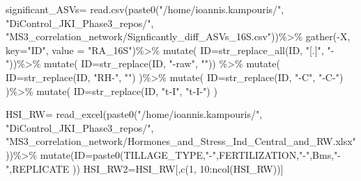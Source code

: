 \documentclass[
]{article}
\newenvironment{Shaded}{\begin{snugshade}}{\end{snugshade}}
\newcommand{\AttributeTok}[1]{\textcolor[rgb]{0.77,0.63,0.00}{#1}}
\newcommand{\DecValTok}[1]{\textcolor[rgb]{0.00,0.00,0.81}{#1}}
\newcommand{\FunctionTok}[1]{\textcolor[rgb]{0.00,0.00,0.00}{#1}}
\newcommand{\NormalTok}[1]{#1}
\newcommand{\OtherTok}[1]{\textcolor[rgb]{0.56,0.35,0.01}{#1}}
\newcommand{\SpecialCharTok}[1]{\textcolor[rgb]{0.00,0.00,0.00}{#1}}
\newcommand{\StringTok}[1]{\textcolor[rgb]{0.31,0.60,0.02}{#1}}
\begin{document}
\begin{Shaded}
\begin{Highlighting}[]
\NormalTok{significant\_ASVs}\OtherTok{=} \FunctionTok{read.csv}\NormalTok{(}\FunctionTok{paste0}\NormalTok{(}\StringTok{"/home/ioannis.kampouris/"}\NormalTok{,}
\StringTok{"DiControl\_JKI\_Phase3\_repos/"}\NormalTok{,}
\StringTok{"MS3\_correlation\_network/Signficantly\_diff\_ASVs\_16S.csv"}\NormalTok{))}\SpecialCharTok{\%\textgreater{}\%}
  \FunctionTok{gather}\NormalTok{(}\SpecialCharTok{{-}}\NormalTok{X, }\AttributeTok{key=}\StringTok{"ID"}\NormalTok{, }\AttributeTok{value =} \StringTok{"RA\_16S"}\NormalTok{)}\SpecialCharTok{\%\textgreater{}\%} \FunctionTok{mutate}\NormalTok{(}
    \AttributeTok{ID=}\FunctionTok{str\_replace\_all}\NormalTok{(ID, }\StringTok{"[.]"}\NormalTok{, }\StringTok{"{-}"}\NormalTok{))}\SpecialCharTok{\%\textgreater{}\%} 
      \FunctionTok{mutate}\NormalTok{(  }\AttributeTok{ID=}\FunctionTok{str\_replace}\NormalTok{(ID, }\StringTok{"{-}raw"}\NormalTok{, }\StringTok{""}\NormalTok{)) }\SpecialCharTok{\%\textgreater{}\%} 
      \FunctionTok{mutate}\NormalTok{(  }\AttributeTok{ID=}\FunctionTok{str\_replace}\NormalTok{(ID, }\StringTok{"RH{-}"}\NormalTok{, }\StringTok{""}\NormalTok{)  )}\SpecialCharTok{\%\textgreater{}\%} 
      \FunctionTok{mutate}\NormalTok{(  }\AttributeTok{ID=}\FunctionTok{str\_replace}\NormalTok{(ID, }\StringTok{"{-}C"}\NormalTok{, }\StringTok{"{-}C{-}"}\NormalTok{)  )}\SpecialCharTok{\%\textgreater{}\%} 
      \FunctionTok{mutate}\NormalTok{(  }\AttributeTok{ID=}\FunctionTok{str\_replace}\NormalTok{(ID, }\StringTok{"t{-}I"}\NormalTok{, }\StringTok{"t{-}I{-}"}\NormalTok{)  )}
  

\NormalTok{HSI\_RW}\OtherTok{=} \FunctionTok{read\_excel}\NormalTok{(}\FunctionTok{paste0}\NormalTok{(}\StringTok{"/home/ioannis.kampouris/"}\NormalTok{,}
\StringTok{"DiControl\_JKI\_Phase3\_repos/"}\NormalTok{,}
\StringTok{"MS3\_correlation\_network/Hormones\_and\_Stress\_Ind\_Central\_and\_RW.xlsx"}\NormalTok{))}\SpecialCharTok{\%\textgreater{}\%}
  \FunctionTok{mutate}\NormalTok{(}\AttributeTok{ID=}\FunctionTok{paste0}\NormalTok{(TILLAGE\_TYPE,}\StringTok{"{-}"}\NormalTok{,FERTILIZATION,}\StringTok{"{-}"}\NormalTok{,Bms,}\StringTok{"{-}"}\NormalTok{,REPLICATE ))}
\NormalTok{HSI\_RW2}\OtherTok{=}\NormalTok{HSI\_RW[,}\FunctionTok{c}\NormalTok{(}\DecValTok{1}\NormalTok{, }\DecValTok{10}\SpecialCharTok{:}\FunctionTok{ncol}\NormalTok{(HSI\_RW))]}



\end{Highlighting}
\end{Shaded}
\end{document}
